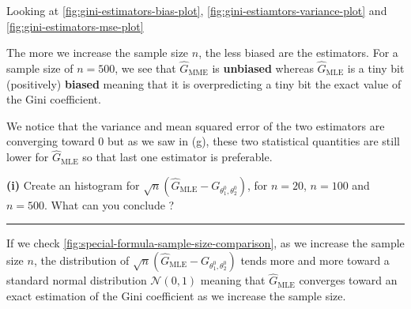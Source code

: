 Looking at \autoref{fig:gini-estimators-bias-plot}, \autoref{fig:gini-estiamtors-variance-plot} and \autoref{fig:gini-estimators-mse-plot}

The more we increase the sample size $n$, the less biased are the estimators. For a sample size of $n = 500$, we see that $\hat{G}_{\text{MME}}$ is \textbf{unbiased} whereas $\hat{G}_{\text{MLE}}$ is a tiny bit (positively) \textbf{biased} meaning that it is overpredicting a tiny bit the exact value of the Gini coefficient. 

We notice that the variance and mean squared error of the two estimators are converging toward $0$ but as we saw in (g), these two statistical quantities are still lower for $\hat{G}_{\text{MLE}}$ so that last one estimator is preferable.

\textbf{(i)} Create an histogram for $\sqrt{n}(\hat{G}_{\text{MLE}} - G_{\theta_1^0, \theta_2^0})$, for $n = 20$, $n = 100$ and $n = 500$. What can you conclude ?

\begin{center}\rule{6cm}{0.4pt}\end{center}

If we check \autoref{fig:special-formula-sample-size-comparison}, as we increase the sample size $n$, the distribution of $\sqrt{n}(\hat{G}_{\text{MLE}} - G_{\theta_1^0, \theta_2^0})$ tends more and more toward a standard normal distribution $\mathcal{N}(0, 1)$ meaning that $\hat{G}_{\text{MLE}}$ converges toward an exact estimation of the Gini coefficient as we increase the sample size.